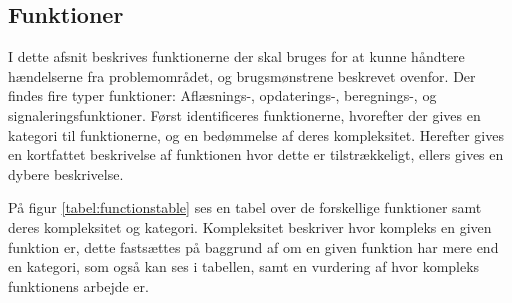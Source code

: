 

\subsection{Funktioner}\label{subsec:funktioner}

I dette afsnit beskrives funktionerne der skal bruges for at kunne håndtere hændelserne fra problemområdet, og brugsmønstrene beskrevet ovenfor.
Der findes fire typer funktioner: Aflæsnings-, opdaterings-, beregnings-, og signaleringsfunktioner.\citep{OOA&D2001}
Først identificeres funktionerne, hvorefter der gives en kategori til funktionerne, og en bedømmelse af deres kompleksitet. Herefter gives en kortfattet beskrivelse af funktionen hvor dette er tilstrækkeligt, ellers gives en dybere beskrivelse.

På figur \ref{tabel:functionstable} ses en tabel over de forskellige funktioner samt deres kompleksitet og kategori.
Kompleksitet beskriver hvor kompleks en given funktion er, dette fastsættes på baggrund af om en given funktion har mere end en kategori, som også kan ses i tabellen, samt en vurdering af hvor kompleks funktionens arbejde er.

